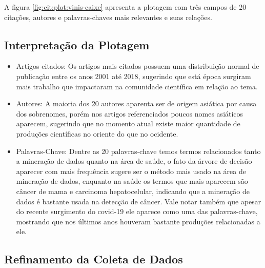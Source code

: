 A figura \ref{fig:cit:plot:vinis-caixe} apresenta a plotagem com três campos de 20 citações, autores e palavras-chaves mais relevantes e suas relações.

\subsection{Interpretação da Plotagem}

\begin{itemize}
    \item Artigos citados: Os artigos mais citados possuem uma distribuição normal de publicação entre os anos 2001 até 2018, sugerindo que está época surgiram mais trabalho que impactaram na comunidade científica em relação ao tema.
    \item Autores: A maioria dos 20 autores aparenta ser de origem asiática por causa dos sobrenomes, porém nos artigos referenciados poucos nomes asiáticos aparecem, sugerindo que no momento atual existe maior quantidade de produções científicas no oriente do que no ocidente.
    \item Palavras-Chave: Dentre as 20 palavras-chave temos termos relacionados tanto a mineração de dados quanto na área de saúde, o fato da árvore de decisão aparecer com mais frequência sugere ser o método mais usado na área de mineração de dados, enquanto na saúde os termos que mais aparecem são câncer de mama e carcinoma hepatocelular, indicando que a mineração de dados é bastante usada na detecção de câncer. Vale notar também que apesar do recente surgimento do covid-19 ele aparece como uma das palavras-chave, mostrando que nos últimos anos houveram bastante produções relacionadas a ele. 
\end{itemize}

\subsection{Refinamento da Coleta de Dados}

